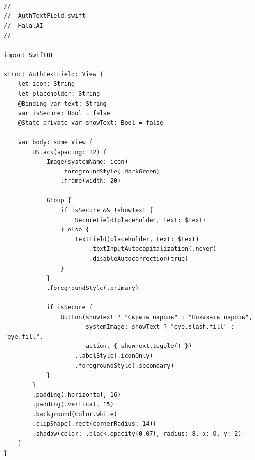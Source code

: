 \begin{lstlisting}[basicstyle=\tiny\ttfamily,breaklines=true]

//
//  AuthTextField.swift
//  HalalAI
//

import SwiftUI

struct AuthTextField: View {
    let icon: String
    let placeholder: String
    @Binding var text: String
    var isSecure: Bool = false
    @State private var showText: Bool = false

    var body: some View {
        HStack(spacing: 12) {
            Image(systemName: icon)
                .foregroundStyle(.darkGreen)
                .frame(width: 20)

            Group {
                if isSecure && !showText {
                    SecureField(placeholder, text: $text)
                } else {
                    TextField(placeholder, text: $text)
                        .textInputAutocapitalization(.never)
                        .disableAutocorrection(true)
                }
            }
            .foregroundStyle(.primary)

            if isSecure {
                Button(showText ? "Скрыть пароль" : "Показать пароль",
                       systemImage: showText ? "eye.slash.fill" : "eye.fill",
                       action: { showText.toggle() })
                    .labelStyle(.iconOnly)
                    .foregroundStyle(.secondary)
            }
        }
        .padding(.horizontal, 16)
        .padding(.vertical, 15)
        .background(Color.white)
        .clipShape(.rect(cornerRadius: 14))
        .shadow(color: .black.opacity(0.07), radius: 8, x: 0, y: 2)
    }
}
\end{lstlisting}

